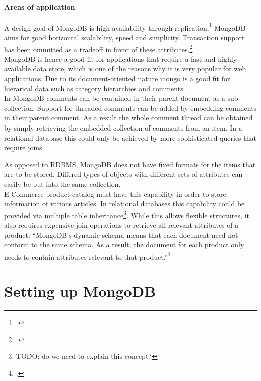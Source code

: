 \paragraph{Areas of application}
A design goal of MongoDB is high availability through
replication.\footcite[Cf.][3]{Plugge_2010}
MongoDB aims for good horizontal scalability, speed and simplicity. Transaction
support has been ommitted as a tradeoff in favor of these
attributes.\footcite[Cf.][5]{Plugge_2010}\\
MongoDB is hence a good fit for applications that require a fast and highly
available data store, which is one of the reasons why it is very popular for web
applications. Due to its document-oriented nature mongo is a good fit for
hierarical data such as category hierarchies and comments.\\
In MongoDB comments can be contained in their parent document as a
sub-collection. Support for threaded comments can be added by embedding comments
in their parent comment. As a result the whole comment thread can be obtained
 by simply retrieving the embedded collection of comments from an item.
In a relational database this could only be achieved by more sophisticated
queries that require joins.

As opposed to RDBMS, MongoDB does not have fixed formats for the items that
are to be stored. Differed types of objects with different sets of attributes
can easily be put into the same collection. \\
E-Commerce product catalog must have this capability in order to store information
of various articles. In relational databases this capability could be provided
via multiple table inheritance\footnote{TODO: do we need to explain this concept?}.
While this allows flexible structures, it also requires expensive join operations 
to retrieve all relevant attributes of a product.
``MongoDB’s dynamic schema means that each document need not conform to the same
schema. As a result, the document for each product only needs to contain
attributes relevant to that product.''\footcite[][]{mongo_product_catalog}

    
\FloatBarrier
\clearpage
\section{Setting up MongoDB}
\label{sec:setup}

